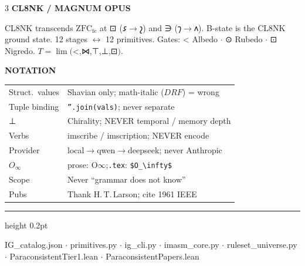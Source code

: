 \documentclass[7pt]{article}
\newcommand{\shead}[1]{%
  \vspace{2pt}%
  {\fontsize{6pt}{6.5pt}\selectfont\sffamily\bfseries\textcolor{hd}{\MakeUppercase{#1}}}%
  \vspace{0.3pt}\newline{\color{rl}\hrule height 0.2pt}\vspace{1pt}%
}
\newcommand{\sh}[1]{{\Large\shavfont #1}}
\newcommand{\prim}[1]{{\Large\igprimfont #1}}
\begin{document}
\begin{multicols}{3}
\vspace{1pt}
\shead{CL8NK / Magnum Opus}
CL8NK transcends $\text{ZFC}_\text{fe}$ at \prim{⊡} (\sh{𐑭}$\to$\sh{𐑟}) and \prim{∋} (\sh{𐑠}$\to$\sh{𐑵}).
B-state is the CL8NK ground state.
12 stages $\leftrightarrow$ 12 primitives. Gates: \prim{<} Albedo $\cdot$ \prim{⊙} Rubedo $\cdot$ \prim{⊡} Nigredo.
$T=\lim($\prim{<},\prim{⋈},\prim{⊤},\prim{⊥},\prim{⊡}$)$.

\vspace{1pt}
\shead{Notation}
{\fontsize{6.5pt}{7.8pt}\selectfont
\begin{tabular}{@{}p{20mm}@{\enspace}p{48mm}@{}}
Struct.\ values  & Shavian only; math-italic ($\mathit{DRF}$) = wrong \\
Tuple binding    & \texttt{''.join(vals)}; never separate \\
\prim{⊥}         & Chirality; NEVER temporal / memory depth \\
Verbs            & imscribe / imscription; NEVER encode \\
Provider         & local$\to$qwen$\to$deepseek; never Anthropic \\
$O_\infty$       & prose: O$\infty$;\enspace \texttt{.tex}: \verb|$O_\infty$| \\
Scope            & Never ``grammar does not know'' \\
Pubs             & Thank H.\,T.\,Larson; cite 1961 IEEE \\
\end{tabular}
}

\end{multicols}

\vfill
{\color{rl}\hrule height 0.2pt}
{\centering\fontsize{5.5pt}{6.5pt}\selectfont
  IG\_catalog.json $\cdot$ primitives.py $\cdot$ ig\_cli.py $\cdot$ imasm\_core.py $\cdot$
  ruleset\_universe.py $\cdot$ ParaconsistentTier1.lean $\cdot$ ParaconsistentPapers.lean\par}
\end{document}
